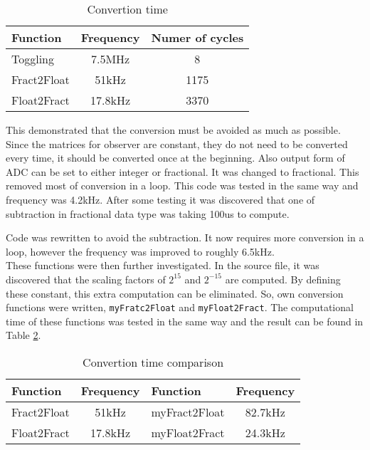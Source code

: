 \begin{table}[h]
\centering
\begin{tabular}{|p{4cm} | c | c|}
\hline
Function    & Frequency & Numer of cycles\\ \hline \hline
Toggling    & 7.5MHz    & 8\\ \hline
Fract2Float & 51kHz     & 1175\\ \hline
Float2Fract & 17.8kHz   & 3370\\ \hline
\end{tabular}
\caption{Convertion time}
\label{tab:conversion}
\end{table}

This demonstrated that the conversion must be avoided as much as possible. Since the matrices for observer are constant, they do not need to be converted every time, it should be converted once at the beginning. Also output form of ADC can be set to either integer or fractional. It was changed to fractional. This removed most of conversion in a loop. This code was tested in the same way and frequency was 4.2kHz. After some testing it was discovered that one of subtraction in fractional data type was taking 100us to compute.

Code was rewritten to avoid the subtraction. It now requires more conversion in a loop, however the frequency was improved to roughly 6.5kHz.\\

These functions were then further investigated. In the source file, it was discovered that the scaling factors of $2^{15}$ and $2^{-15}$ are computed. By defining these constant, this extra computation can be eliminated. So, own conversion functions were written, \texttt{myFratc2Float} and \texttt{myFloat2Fract}. The computational time of these functions was tested in the same way and the result can be found in Table \ref{tab:conversion2}.

\begin{table}[h]
\centering
\begin{tabular}{|p{4cm} | c | p{4cm} | c |}
\hline
Function    & Frequency & Function       & Frequency \\ \hline \hline
Fract2Float & 51kHz     & myFract2Float  & 82.7kHz\\ \hline
Float2Fract & 17.8kHz   & myFloat2Fract  & 24.3kHz\\ \hline
\end{tabular}
\caption{Convertion time comparison}
\label{tab:conversion2}
\end{table}

